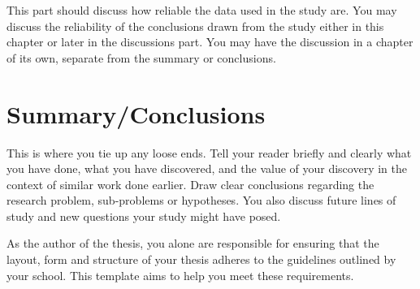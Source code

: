 \documentclass[english, 12pt, a4paper, biz, utf8, a-2b, online]{aaltothesis}
\begin{document}
This part should discuss how reliable the data used in the study are. You may 
discuss the reliability of the conclusions drawn from the study either in this 
chapter or later in the discussions part. You may have the discussion in a 
chapter of its own, separate from the summary or conclusions.


\clearpage

\section{Summary/Conclusions}
\label{sec:summary}

This is where you tie up any loose ends. Tell your reader briefly and clearly 
what you have done, what you have discovered, and the value of your discovery 
in the context of similar work done earlier. Draw clear conclusions regarding 
the research problem, sub-problems or hypotheses. You also discuss future lines 
of study and new questions your study might have posed.

As the author of the thesis, you alone are responsible for ensuring that the 
layout, form and structure of your thesis adheres to the guidelines outlined by 
your school. This template aims to help you meet these requirements.



\clearpage
\thesisbibliography
\end{document}
